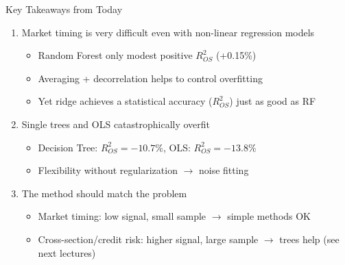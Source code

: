 \documentclass[10pt]{beamer}
\begin{document}
\begin{frame}{Key Takeaways from Today}
  \begin{enumerate}
    \item Market timing is very difficult even with non-linear regression models
    \begin{itemize}
      \item Random Forest only modest positive $R^2_{OS}$ (+0.15\%)
      \item Averaging + decorrelation helps to control overfitting
      \item Yet ridge achieves a statistical accuracy ($R^2_{OS}$) just as good as RF
    \end{itemize}
\vspace{0.3em}
     \item Single trees and OLS catastrophically overfit
    \begin{itemize}
      \item Decision Tree: $R^2_{OS} = -10.7\%$, OLS: $R^2_{OS} = -13.8\%$
      \item Flexibility without regularization $\to$ noise fitting
    \end{itemize}
    \vspace{0.3em}
    \item The method should match the problem
    \begin{itemize}
      \item Market timing: low signal, small sample $\to$ simple methods OK
      \item Cross-section/credit risk: higher signal, large sample $\to$ trees help (see next lectures)
    \end{itemize}
 \end{enumerate}
\end{frame}

\end{document}
